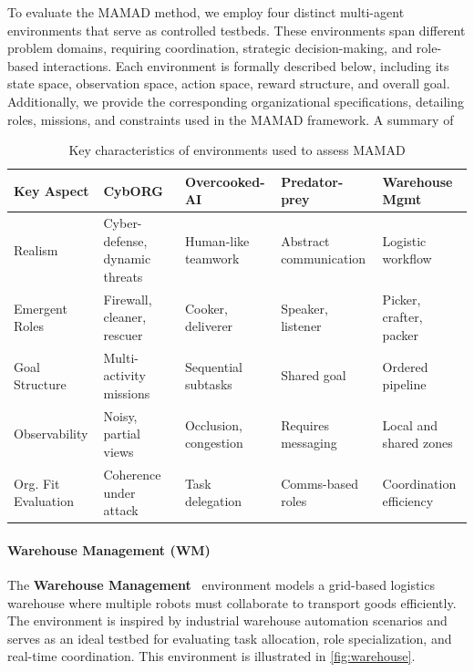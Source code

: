 \documentclass[pdflatex,sn-mathphys-num]{sn-jnl}%
\theoremstyle{thmstyleone}%
\theoremstyle{thmstyletwo}%
\theoremstyle{thmstylethree}%
\begin{document}
To evaluate the MAMAD method, we employ four distinct multi-agent environments that serve as controlled testbeds. These environments span different problem domains, requiring coordination, strategic decision-making, and role-based interactions. Each environment is formally described below, including its state space, observation space, action space, reward structure, and overall goal. Additionally, we provide the corresponding organizational specifications, detailing roles, missions, and constraints used in the MAMAD framework. A summary of 

\begin{table}[h!]
    \centering
    \begin{footnotesize}
        \renewcommand{\arraystretch}{1.3}
        \begin{tabular}{p{2cm}p{2.2cm}p{2.2cm}p{2.2cm}p{2.2cm}}
            \hline
            \textbf{Key Aspect} & \textbf{CybORG}                & \textbf{Overcooked-AI} & \textbf{Predator-prey} & \textbf{Warehouse Mgmt} \\ \hline
            Realism             & Cyber-defense, dynamic threats & Human-like teamwork    & Abstract communication & Logistic workflow       \\ \hline
            Emergent Roles      & Firewall, cleaner, rescuer     & Cooker, deliverer      & Speaker, listener      & Picker, crafter, packer \\ \hline
            Goal Structure      & Multi-activity missions           & Sequential subtasks    & Shared goal            & Ordered pipeline        \\ \hline
            Observability       & Noisy, partial views           & Occlusion, congestion  & Requires messaging     & Local and shared zones  \\ \hline
            Org. Fit Evaluation & Coherence under attack         & Task delegation        & Comms-based roles      & Coordination efficiency \\ \hline
        \end{tabular}
        \caption{Key characteristics of environments used to assess MAMAD}
        \label{tab:mamad_env_characteristics}
    \end{footnotesize}
\end{table}


\paragraph{Warehouse Management (WM)}
The \textbf{Warehouse Management}~\cite{warehouse_management} environment models a grid-based logistics warehouse where multiple robots must collaborate to transport goods efficiently. The environment is inspired by industrial warehouse automation scenarios and serves as an ideal testbed for evaluating task allocation, role specialization, and real-time coordination. This environment is illustrated in \autoref{fig:warehouse}.
\end{document}
